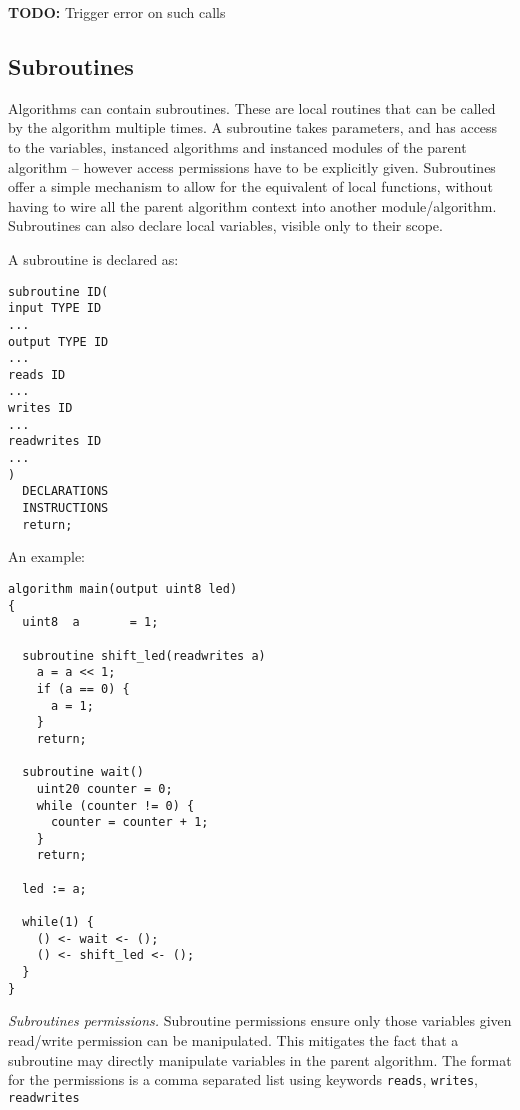 \documentclass[a4]{article}
\newcommand\todo[1]{{\color{magenta}\textbf{TODO:} #1}}
\begin{document}
\vspace*{5mm}
\noindent
{}
\todo{Trigger error on such calls}


\subsection{Subroutines}

Algorithms can contain subroutines. These are local routines that can be called by the algorithm multiple times. A subroutine takes parameters, and has access to the variables, instanced algorithms and instanced modules of the parent algorithm -- however access permissions have to be explicitly given. 
%
Subroutines offer a simple mechanism to allow for the equivalent of local functions, without having to wire all the parent algorithm context into another module/algorithm. Subroutines can also declare local variables, visible only to their scope.

A subroutine is declared as:

\begin{verbatim}
subroutine ID(
input TYPE ID
...
output TYPE ID
...
reads ID
...
writes ID
...
readwrites ID
...
)
  DECLARATIONS
  INSTRUCTIONS
  return;
\end{verbatim}

An example:

\begin{verbatim}
algorithm main(output uint8 led)
{
  uint8  a       = 1;

  subroutine shift_led(readwrites a)
    a = a << 1;
    if (a == 0) {
      a = 1;
    }
    return;

  subroutine wait()
    uint20 counter = 0;
    while (counter != 0) {
      counter = counter + 1;
    }
    return;
    
  led := a;
  
  while(1) {
    () <- wait <- ();
    () <- shift_led <- ();
  }
}
\end{verbatim}

\noindent \textit{Subroutines permissions.} Subroutine permissions ensure only those variables given read/write
permission can be manipulated. This mitigates the fact that a subroutine may directly manipulate variables in the 
parent algorithm. The format for the permissions is a comma separated list using keywords \texttt{reads}, \texttt{writes}, \texttt{readwrites} \\
\end{document}

